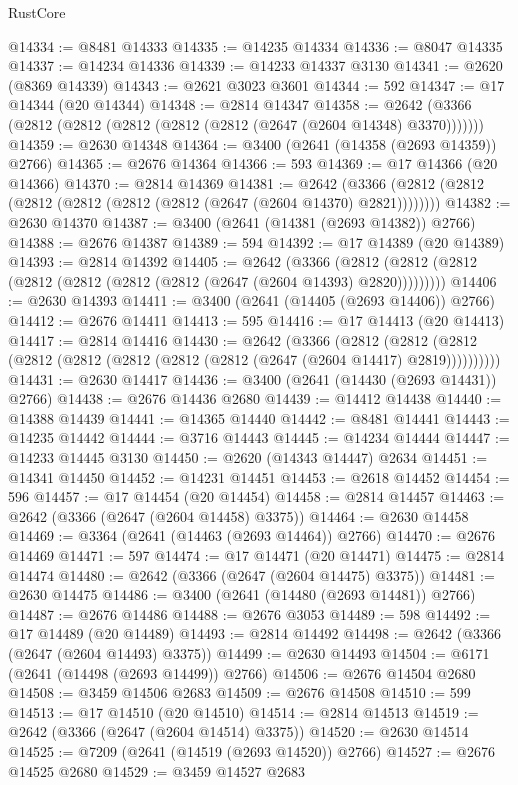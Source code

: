 \begin{lexlean}{RustCore}
\begin{coremodule}
@14334 := @8481 @14333
@14335 := @14235 @14334
@14336 := @8047 @14335
@14337 := @14234 @14336
@14339 := @14233 @14337 @3130
@14341 := @2620 (@8369 @14339)
@14343 := @2621 @3023 @3601
@14344 := 592
@14347 := @17 @14344 (@20 @14344)
@14348 := @2814 @14347
@14358 := @2642 (@3366 (@2812 (@2812 (@2812 (@2812 (@2812 (@2647 (@2604 @14348) @3370)))))))
@14359 := @2630 @14348
@14364 := @3400 (@2641 (@14358 (@2693 @14359)) @2766)
@14365 := @2676 @14364
@14366 := 593
@14369 := @17 @14366 (@20 @14366)
@14370 := @2814 @14369
@14381 := @2642 (@3366 (@2812 (@2812 (@2812 (@2812 (@2812 (@2812 (@2647 (@2604 @14370) @2821))))))))
@14382 := @2630 @14370
@14387 := @3400 (@2641 (@14381 (@2693 @14382)) @2766)
@14388 := @2676 @14387
@14389 := 594
@14392 := @17 @14389 (@20 @14389)
@14393 := @2814 @14392
@14405 := @2642
    (@3366 (@2812 (@2812 (@2812 (@2812 (@2812 (@2812 (@2812 (@2647 (@2604 @14393) @2820)))))))))
@14406 := @2630 @14393
@14411 := @3400 (@2641 (@14405 (@2693 @14406)) @2766)
@14412 := @2676 @14411
@14413 := 595
@14416 := @17 @14413 (@20 @14413)
@14417 := @2814 @14416
@14430 := @2642
    (@3366
      (@2812 (@2812 (@2812 (@2812 (@2812 (@2812 (@2812 (@2812 (@2647 (@2604 @14417) @2819))))))))))
@14431 := @2630 @14417
@14436 := @3400 (@2641 (@14430 (@2693 @14431)) @2766)
@14438 := @2676 @14436 @2680
@14439 := @14412 @14438
@14440 := @14388 @14439
@14441 := @14365 @14440
@14442 := @8481 @14441
@14443 := @14235 @14442
@14444 := @3716 @14443
@14445 := @14234 @14444
@14447 := @14233 @14445 @3130
@14450 := @2620 (@14343 @14447) @2634
@14451 := @14341 @14450
@14452 := @14231 @14451
@14453 := @2618 @14452
@14454 := 596
@14457 := @17 @14454 (@20 @14454)
@14458 := @2814 @14457
@14463 := @2642 (@3366 (@2647 (@2604 @14458) @3375))
@14464 := @2630 @14458
@14469 := @3364 (@2641 (@14463 (@2693 @14464)) @2766)
@14470 := @2676 @14469
@14471 := 597
@14474 := @17 @14471 (@20 @14471)
@14475 := @2814 @14474
@14480 := @2642 (@3366 (@2647 (@2604 @14475) @3375))
@14481 := @2630 @14475
@14486 := @3400 (@2641 (@14480 (@2693 @14481)) @2766)
@14487 := @2676 @14486
@14488 := @2676 @3053
@14489 := 598
@14492 := @17 @14489 (@20 @14489)
@14493 := @2814 @14492
@14498 := @2642 (@3366 (@2647 (@2604 @14493) @3375))
@14499 := @2630 @14493
@14504 := @6171 (@2641 (@14498 (@2693 @14499)) @2766)
@14506 := @2676 @14504 @2680
@14508 := @3459 @14506 @2683
@14509 := @2676 @14508
@14510 := 599
@14513 := @17 @14510 (@20 @14510)
@14514 := @2814 @14513
@14519 := @2642 (@3366 (@2647 (@2604 @14514) @3375))
@14520 := @2630 @14514
@14525 := @7209 (@2641 (@14519 (@2693 @14520)) @2766)
@14527 := @2676 @14525 @2680
@14529 := @3459 @14527 @2683

\end{coremodule}
\end{lexlean}
